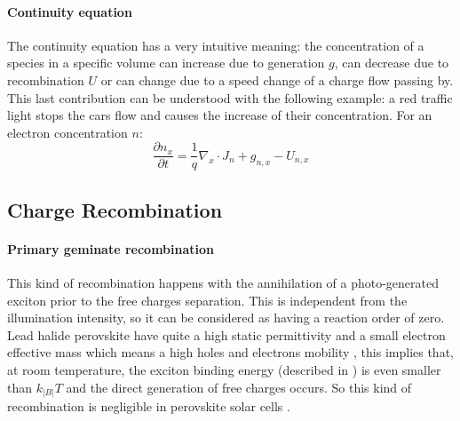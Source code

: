 		\paragraph{Continuity equation}
		The continuity equation has a very intuitive meaning: the concentration of a species in a specific volume can increase due to generation $g$, can decrease due to recombination $U$ or can change due to a speed change of a charge flow passing by.
		This last contribution can be understood with the following example: a red traffic light stops the cars flow and causes the increase of their concentration.
		For an electron concentration $n$:
		\begin{equation}\label{eq_continuity}
			\frac{\partial n_x}{\partial t} = \frac{1}{q}\nabla_x \cdot J_n + g_{n,x} - U_{n,x}
		\end{equation}

	\subsection{Charge Recombination}

		\paragraph{Primary geminate recombination} \label{intro_geminate}
		This kind of recombination happens with the annihilation of a photo-generated exciton prior to the free charges separation.
		This is independent from the illumination intensity, so it can be considered as having a reaction order of zero.
		Lead halide perovskite have quite a high static permittivity \cite{Moia2019} and a small electron effective mass \cite{Herz2017} which means a high holes and electrons mobility \cite{Leijtens2014}, this implies that, at room temperature, the exciton binding energy (described in ) is even smaller than $k_|B|T$ \cite{Miyata2015,Galkowski2016,Tvingstedt2015} and the direct generation of free charges occurs.
		So this kind of recombination is negligible in perovskite solar cells \cite{Wehrenfennig2014}.

